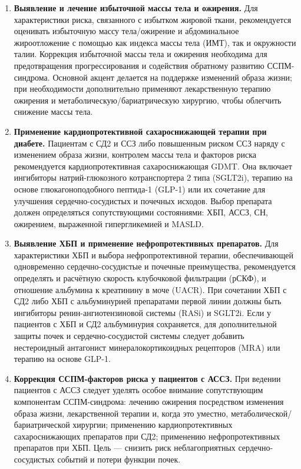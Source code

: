 \documentclass[11pt,a4paper]{article}
\begin{document}
\begin{enumerate}[label=\arabic*.]
\item \textbf{Выявление и лечение избыточной массы тела и ожирения.} Для характеристики риска, связанного с избытком жировой ткани, рекомендуется оценивать избыточную массу тела/ожирение и абдоминальное жироотложение с помощью как индекса массы тела (ИМТ), так и окружности талии. Коррекция избыточной массы тела и ожирения необходима для предотвращения прогрессирования и содействия обратному развитию ССПМ-синдрома. Основной акцент делается на поддержке изменений образа жизни; при необходимости дополнительно применяют лекарственную терапию ожирения и метаболическую/бариатрическую хирургию, чтобы облегчить снижение массы тела.

\item \textbf{Применение кардиопротективной сахароснижающей терапии при диабете.} Пациентам с СД2 и ССЗ либо повышенным риском ССЗ наряду с изменением образа жизни, контролем массы тела и факторов риска рекомендуется кардиопротективная сахароснижающая GDMT. Она включает ингибиторы натрий-глюкозного котранспортера 2 типа (SGLT2i), терапию на основе глюкагоноподобного пептида-1 (GLP-1) или их сочетание для улучшения сердечно-сосудистых и почечных исходов. Выбор препарата должен определяться сопутствующими состояниями: ХБП, АССЗ, СН, ожирением, выраженной гипергликемией и MASLD.

\item \textbf{Выявление ХБП и применение нефропротективных препаратов.} Для характеристики ХБП и выбора нефропротективной терапии, обеспечивающей одновременно сердечно-сосудистые и почечные преимущества, рекомендуется определять и расчётную скорость клубочковой фильтрации (рСКФ), и отношение альбумина к креатинину в моче (UACR). При сочетании ХБП с СД2 либо ХБП с альбуминурией препаратами первой линии должны быть ингибиторы ренин-ангиотензиновой системы (RASi) и SGLT2i. Если у пациентов с ХБП и СД2 альбуминурия сохраняется, для дополнительной защиты почек и сердечно-сосудистой системы следует добавить нестероидный антагонист минералокортикоидных рецепторов (MRA) или терапию на основе GLP-1.

\item \textbf{Коррекция ССПМ-факторов риска у пациентов с АССЗ.} При ведении пациентов с АССЗ следует уделять особое внимание сопутствующим компонентам ССПМ-синдрома: лечению ожирения посредством изменения образа жизни, лекарственной терапии и, когда это уместно, метаболической/бариатрической хирургии; применению кардиопротективных сахароснижающих препаратов при СД2; применению нефропротективных препаратов при ХБП. Цель --- снизить риск неблагоприятных сердечно-сосудистых событий и потери функции почек.


\end{enumerate}
\end{document}
